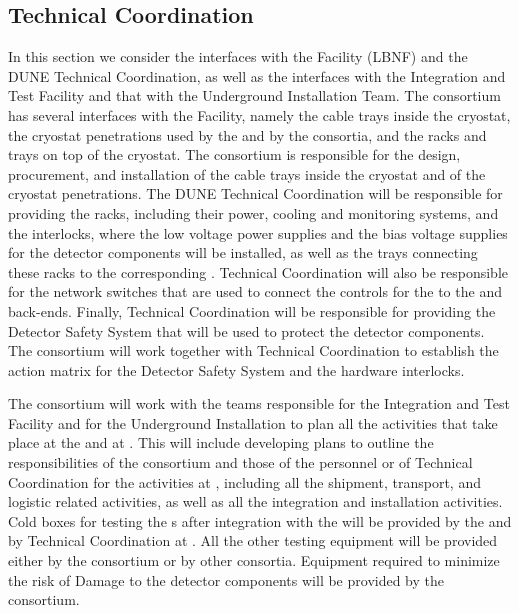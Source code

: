 \subsection{Technical Coordination}
\label{sec:fdsp-tpcelec-interfaces-tc}

In this section we consider the interfaces with the Facility (LBNF)
and the DUNE Technical Coordination, as well as the interfaces with
the Integration and Test Facility and that with the Underground
Installation Team. The  consortium has several
interfaces with the Facility, namely the cable trays inside the
cryostat, the cryostat penetrations used by the 
and by the  consortia, and the racks and trays on top
of the cryostat. The  consortium is responsible
for the design, procurement, and installation of the cable trays
inside the cryostat and of the cryostat penetrations. The DUNE
Technical Coordination will be responsible for providing the racks,
including their power, cooling and monitoring systems, and the interlocks,
where the low voltage power supplies and the bias voltage supplies
for the  detector components will be installed, as well as the trays
connecting these racks to the corresponding . Technical
Coordination will also be responsible for the network switches that
are used to connect the controls for the  to the
 and  back-ends. Finally, Technical Coordination will
be responsible for providing the Detector Safety System that will be used to protect
the  detector components. The 
consortium will work together with Technical Coordination to establish
the action matrix for the Detector Safety System and the hardware
interlocks.

The  consortium will work with the teams responsible
for the Integration and Test Facility and for the Underground Installation
to plan all the activities that take place at the  and at
\surf. This will include developing plans to outline the responsibilities
of the consortium and those of the  personnel or of 
Technical Coordination for the activities at \surf, including all the
shipment, transport, and logistic related activities, as well as all
the integration and installation activities. Cold boxes for testing
the s after integration with the  will be 
provided by the  and by Technical Coordination at \surf.
All the other testing equipment will be provided either by the 
consortium or by other consortia. Equipment required to
minimize the risk of  Damage to the detector components
will  be provided by the  consortium. 

